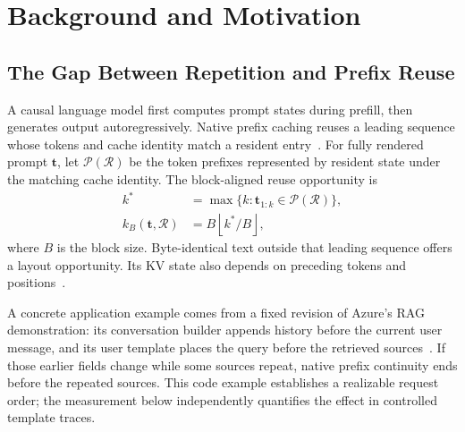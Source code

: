\section{Background and Motivation}
\label{sec:background}

\subsection{The Gap Between Repetition and Prefix Reuse}
A causal language model first computes prompt states during prefill, then generates output autoregressively. Native prefix caching reuses a leading sequence whose tokens and cache identity match a resident entry~\cite{vllm2023,sglang2024}. For fully rendered prompt $\mathbf{t}$, let $\mathcal P(\mathcal R)$ be the token prefixes represented by resident state under the matching cache identity. The block-aligned reuse opportunity is
\begin{equation}
\begin{aligned}
 k^*&=\max\{k:\mathbf{t}_{1:k}\in\mathcal P(\mathcal R)\},\\
 k_B(\mathbf{t},\mathcal R)&=B\left\lfloor k^*/B\right\rfloor,
\end{aligned}
\label{eq:native}
\end{equation}
where $B$ is the block size. Byte-identical text outside that leading sequence offers a layout opportunity. Its KV state also depends on preceding tokens and positions~\cite{vllm2023}.

A concrete application example comes from a fixed revision of Azure's RAG demonstration: its conversation builder appends history before the current user message, and its user template places the query before the retrieved sources~\cite{azuretemplate}. If those earlier fields change while some sources repeat, native prefix continuity ends before the repeated sources. This code example establishes a realizable request order; the measurement below independently quantifies the effect in controlled template traces.

